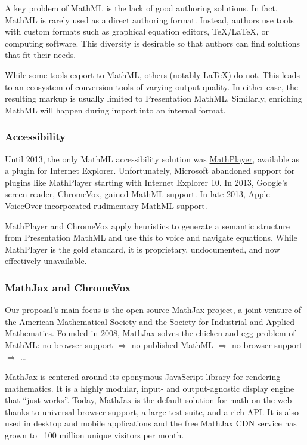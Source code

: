 \documentclass[12pt]{amsart}
\begin{document}
A key problem of MathML is the lack of good authoring solutions. In fact, 
MathML is rarely used as a direct authoring format. Instead, authors use tools 
with custom formats such as graphical equation editors, \TeX/\LaTeX, or computing 
software. This diversity is desirable so that authors can find solutions that 
fit their needs.

While some tools export to MathML, others (notably  \LaTeX) do not. This leads 
to an ecosystem of conversion tools of varying output quality. In either case, 
the resulting markup is usually limited to Presentation MathML. 
Similarly, enriching MathML will happen during import into an internal format.

\subsubsection*{Accessibility}

Until 2013, the only MathML accessibility solution was 
\href{http://www.dessci.com/en/products/mathplayer/}{MathPlayer}, available as 
a plugin for Internet Explorer. Unfortunately, Microsoft abandoned support for 
plugins like MathPlayer starting with Internet Explorer 10. In 2013, Google's 
screen reader, \href{http://www.chromevox.com/}{ChromeVox}, gained MathML 
support. In late 2013, 
\href{http://www.apple.com/accessibility/}{Apple VoiceOver}
incorporated rudimentary MathML support.

MathPlayer and ChromeVox apply heuristics to generate a semantic structure from 
Presentation MathML and use this to voice and navigate equations. While MathPlayer is the 
gold standard, it is proprietary, undocumented, and now effectively unavailable.

\subsubsection*{MathJax and ChromeVox}

Our proposal's main focus is the open-source 
\href{http://www.mathjax.org}{MathJax project}, a joint venture 
of the American Mathematical Society and the Society for Industrial and Applied 
Mathematics. Founded in 2008, MathJax solves the chicken-and-egg problem of 
MathML: no browser support $\Rightarrow$ no published MathML $\Rightarrow$ no 
browser support $\Rightarrow$ \ldots 

MathJax is centered around its eponymous JavaScript library for rendering 
mathematics. It is  a highly modular, input- and output-agnostic display engine 
that ``just works''. Today, MathJax is the default solution for math on the web 
thanks to universal browser support, a large test suite, and a rich API. It is 
also used in desktop and mobile applications and the free MathJax CDN service 
has grown to ~100 million unique visitors per month.
\end{document}
